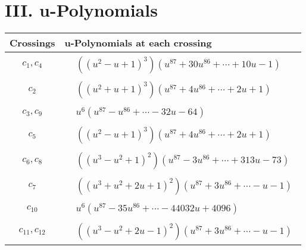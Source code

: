 \documentclass[1p]{elsarticle_modified}
\theoremstyle{definition}
\begin{document}
\newpage\renewcommand{\arraystretch}{1}
\centering \section*{ III. u-Polynomials}
\begin{tabular}{m{50pt}|m{274pt}}
Crossings & \hspace{64pt}u-Polynomials at each crossing \\
\hline $$\begin{aligned}c_{1},c_{4}\end{aligned}$$&$\begin{aligned}
&((u^2- u+1)^3)(u^{87}+30 u^{86}+\cdots+10 u-1)
\end{aligned}$\\
\hline $$\begin{aligned}c_{2}\end{aligned}$$&$\begin{aligned}
&((u^2+u+1)^3)(u^{87}+4 u^{86}+\cdots+2 u+1)
\end{aligned}$\\
\hline $$\begin{aligned}c_{3},c_{9}\end{aligned}$$&$\begin{aligned}
&u^6(u^{87}- u^{86}+\cdots-32 u-64)
\end{aligned}$\\
\hline $$\begin{aligned}c_{5}\end{aligned}$$&$\begin{aligned}
&((u^2- u+1)^3)(u^{87}+4 u^{86}+\cdots+2 u+1)
\end{aligned}$\\
\hline $$\begin{aligned}c_{6},c_{8}\end{aligned}$$&$\begin{aligned}
&((u^3- u^2+1)^2)(u^{87}-3 u^{86}+\cdots+313 u-73)
\end{aligned}$\\
\hline $$\begin{aligned}c_{7}\end{aligned}$$&$\begin{aligned}
&((u^3+u^2+2 u+1)^2)(u^{87}+3 u^{86}+\cdots- u-1)
\end{aligned}$\\
\hline $$\begin{aligned}c_{10}\end{aligned}$$&$\begin{aligned}
&u^6(u^{87}-35 u^{86}+\cdots-44032 u+4096)
\end{aligned}$\\
\hline $$\begin{aligned}c_{11},c_{12}\end{aligned}$$&$\begin{aligned}
&((u^3- u^2+2 u-1)^2)(u^{87}+3 u^{86}+\cdots- u-1)
\end{aligned}$\\
\hline
\end{tabular}\newpage\renewcommand{\arraystretch}{1}
\end{document}
